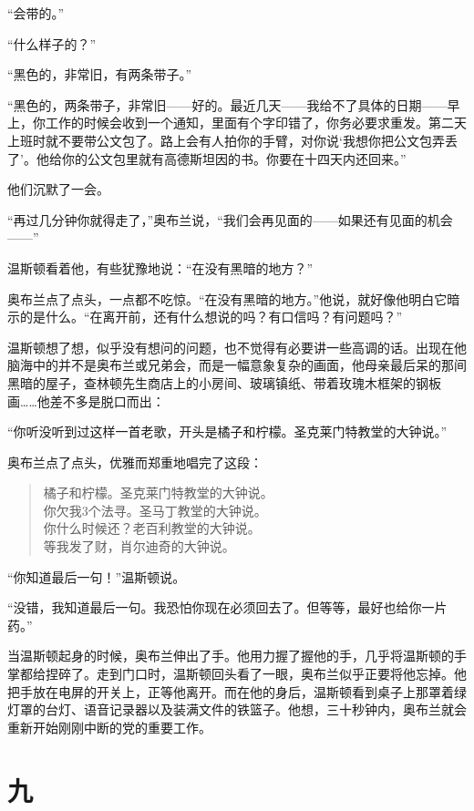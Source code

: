 ``会带的。''

``什么样子的？''

``黑色的，非常旧，有两条带子。''

``黑色的，两条带子，非常旧——好的。最近几天——我给不了具体的日期——早上，你工作的时候会收到一个通知，里面有个字印错了，你务必要求重发。第二天上班时就不要带公文包了。路上会有人拍你的手臂，对你说`我想你把公文包弄丢了'。他给你的公文包里就有高德斯坦因的书。你要在十四天内还回来。''

他们沉默了一会。

``再过几分钟你就得走了，''奥布兰说，``我们会再见面的——如果还有见面的机会——''

温斯顿看着他，有些犹豫地说：``在没有黑暗的地方？''

奥布兰点了点头，一点都不吃惊。``在没有黑暗的地方。''他说，就好像他明白它暗示的是什么。``在离开前，还有什么想说的吗？有口信吗？有问题吗？''

温斯顿想了想，似乎没有想问的问题，也不觉得有必要讲一些高调的话。出现在他脑海中的并不是奥布兰或兄弟会，而是一幅意象复杂的画面，他母亲最后呆的那间黑暗的屋子，查林顿先生商店上的小房间、玻璃镇纸、带着玫瑰木框架的钢板画\ldots\ldots 他差不多是脱口而出：

``你听没听到过这样一首老歌，开头是橘子和柠檬。圣克莱门特教堂的大钟说。''

奥布兰点了点头，优雅而郑重地唱完了这段：

\begin{quotation}
\noindent 橘子和柠檬。圣克莱门特教堂的大钟说。\\
你欠我3个法寻。圣马丁教堂的大钟说。\\
你什么时候还？老百利教堂的大钟说。\\
等我发了财，肖尔迪奇的大钟说。
\end{quotation}

``你知道最后一句！''温斯顿说。

``没错，我知道最后一句。我恐怕你现在必须回去了。但等等，最好也给你一片药。''

当温斯顿起身的时候，奥布兰伸出了手。他用力握了握他的手，几乎将温斯顿的手掌都给捏碎了。走到门口时，温斯顿回头看了一眼，奥布兰似乎正要将他忘掉。他把手放在电屏的开关上，正等他离开。而在他的身后，温斯顿看到桌子上那罩着绿灯罩的台灯、语音记录器以及装满文件的铁篮子。他想，三十秒钟内，奥布兰就会重新开始刚刚中断的党的重要工作。

\section*{九}\label{ux5341ux4e03}

